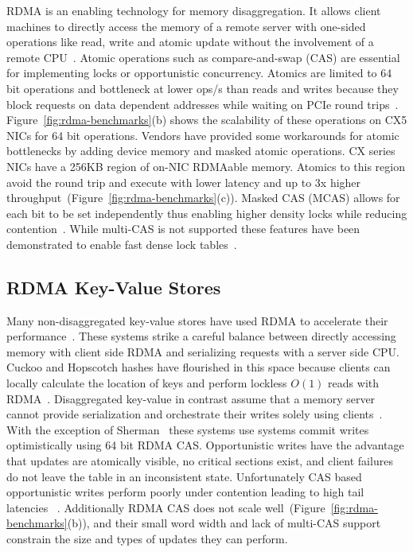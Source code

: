 RDMA is an enabling technology for memory disaggregation. It
allows client machines to directly access the memory of a
remote server with one-sided operations like read, write and
atomic update without the involvement of a remote
CPU~\cite{infiniband-spec}.  
Atomic operations such as compare-and-swap (CAS) are
essential for implementing locks or opportunistic
concurrency. Atomics are limited to 64 bit operations and
bottleneck at lower ops/s than reads and writes because they
block requests on data dependent addresses while waiting on
PCIe round trips~\cite{design-guidelines,sherman}.
Figure~\ref{fig:rdma-benchmarks}(b) shows the scalability of
these operations on CX5 NICs for 64 bit operations.
Vendors have provided some workarounds for atomic
bottlenecks by adding device memory and masked atomic
operations. CX series NICs have a 256KB region of on-NIC
RDMAable memory. Atomics to this region avoid the round trip
and execute with lower latency and up to 3x higher
throughput~\cite{device-memory}(Figure~\ref{fig:rdma-benchmarks}(c)).
Masked CAS (MCAS) allows for each bit to be set
independently thus enabling higher density locks while
reducing contention~\cite{rdma-masked-cas}. While multi-CAS
is not supported these features have been demonstrated to
enable fast dense lock tables~\cite{sherman}.


\subsection{RDMA Key-Value Stores}

Many non-disaggregated key-value stores have used RDMA to
accelerate their
performance~\cite{farm,memc3,erpc,herd,faast,mica,pilaf,cell,storm}.
These systems strike a careful balance between directly
accessing memory with client side RDMA and serializing
requests with a server side CPU.
Cuckoo and Hopscotch hashes have flourished in this space
because clients can locally calculate the location of keys
and perform lockless $O(1)$ reads with
RDMA~\cite{hopscotch,farm,pilaf,cuckoo}.
Disaggregated key-value in contrast assume that a memory
server cannot provide serialization and orchestrate their
writes solely using
clients~\cite{rolex,fusee,clover,sherman,ford,race}. With
the exception of Sherman~\cite{sherman} these systems use
systems commit writes optimistically using 64 bit RDMA CAS. 
Opportunistic writes have the advantage that updates are
atomically visible, no critical sections exist, and client
failures do not leave the table in an inconsistent state.
Unfortunately CAS based opportunistic writes perform poorly
under contention leading to high tail latencies
~\cite{clover}. Additionally RDMA CAS does not scale
well~\cite{design-guidelines}(Figure~\ref{fig:rdma-benchmarks}(b)),
and their small word width and lack of multi-CAS support
constrain the size and types of updates they can perform.

